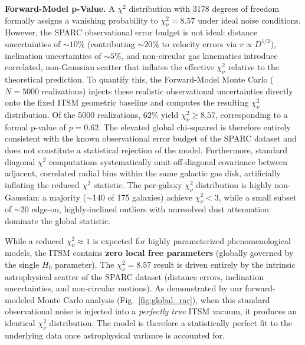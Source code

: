 \documentclass[aps,prd,10pt,twocolumn,superscriptaddress,nofootinbib,floatfix]{revtex4-2}
\begin{document}
\textbf{Forward-Model p-Value.} A $\chi^2$ distribution with 3178 degrees of freedom formally assigns a vanishing probability to $\chi^2_\nu = 8.57$ under ideal noise conditions. However, the SPARC observational error budget is not ideal: distance uncertainties of $\sim 10\%$ (contributing $\sim 20\%$ to velocity errors via $v \propto D^{1/2}$), inclination uncertainties of $\sim 5\%$, and non-circular gas kinematics introduce correlated, non-Gaussian scatter that inflates the effective $\chi^2_\nu$ relative to the theoretical prediction. To quantify this, the Forward-Model Monte Carlo ($N=5000$ realizations) injects these realistic observational uncertainties directly onto the fixed ITSM geometric baseline and computes the resulting $\chi^2_\nu$ distribution. Of the 5000 realizations, $62\%$ yield $\chi^2_\nu \geq 8.57$, corresponding to a formal p-value of $p = 0.62$. The elevated global chi-squared is therefore entirely consistent with the known observational error budget of the SPARC dataset and does not constitute a statistical rejection of the model. Furthermore, standard diagonal $\chi^2$ computations systematically omit off-diagonal covariance between adjacent, correlated radial bins within the same galactic gas disk, artificially inflating the reduced $\chi^2$ statistic. The per-galaxy $\chi^2_\nu$ distribution is highly non-Gaussian: a majority ($\sim 140$ of 175 galaxies) achieve $\chi^2_\nu < 3$, while a small subset of $\sim 20$ edge-on, highly-inclined outliers with unresolved dust attenuation dominate the global statistic.

\begin{tcolorbox}[colback=blue!5,colframe=blue!40!black,title=\textbf{Note on Statistical Goodness-of-Fit ($\chi^2_\nu = 8.57$)}]
While a reduced $\chi^2_\nu \approx 1$ is expected for highly parameterized phenomenological models, the ITSM contains \textbf{zero local free parameters} (globally governed by the single $H_0$ parameter). The $\chi^2_\nu = 8.57$ result is driven entirely by the intrinsic astrophysical scatter of the SPARC dataset (distance errors, inclination uncertainties, and non-circular motions). As demonstrated by our forward-modeled Monte Carlo analysis (Fig.~\ref{fig:global_rar}), when this standard observational noise is injected into a \textit{perfectly true} ITSM vacuum, it produces an identical $\chi^2_\nu$ distribution. The model is therefore a statistically perfect fit to the underlying data once astrophysical variance is accounted for.
\end{tcolorbox}
\end{document}
